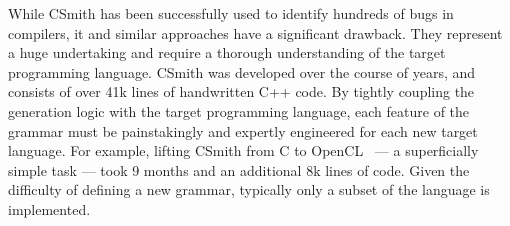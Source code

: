 While CSmith has been successfully used to identify hundreds of bugs in compilers, it and similar approaches have a significant drawback. They represent a huge undertaking and require a thorough understanding of the target programming language. CSmith was developed over the course of years, and consists of over 41k lines of handwritten C++ code. By tightly coupling the generation logic with the target programming language, each feature of the grammar must be painstakingly and expertly engineered for each new target language. For example, lifting CSmith from C to OpenCL~\cite{Lidbury2015a} --- a superficially simple task --- took 9 months and an additional 8k lines of code. Given the difficulty of defining a new grammar, typically only a subset of the language is implemented.





